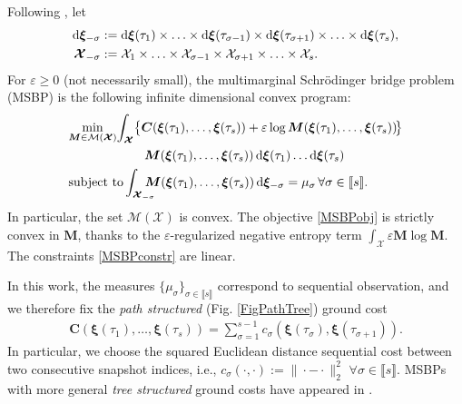 \documentclass[letterpaper, 10pt, twocolumn]{ieeeconf}      %
\newcommand{\differential}{{\rm{d}}}
\begin{document}
Following \cite[Sec. 3]{elvander2020multi}, let
{\small{\begin{subequations}
\begin{align}
\differential\bm{\xi}_{-\sigma}&:=\differential\bm{\xi}(\tau_{1})\times\hdots\times\differential\bm{\xi}(\tau_{\sigma-1})\times\differential\bm{\xi}(\tau_{\sigma+1})\times\hdots\times\differential\bm{\xi}(\tau_{s}),\\
\bm{\mathcal{X}}_{-\sigma}&:=\mathcal{X}_{1}\times\hdots\times\mathcal{X}_{\sigma -1}\times\mathcal{X}_{\sigma + 1}\times \hdots \times \mathcal{X}_{s}.    
\end{align}
\label{DefxiX}
\end{subequations}}} 
For $\varepsilon\geq 0$ (not necessarily small), the multimarginal Schr\"{o}dinger bridge problem (MSBP) is the following infinite dimensional convex program:
{\small{\begin{subequations}
\begin{align}
&\underset{\bm{M}\in \mathcal{M}\left(\bm{\mathcal{X}}\right)}{\min} \!\int_{\bm{\mathcal{X}}}\!\big\{\bm{C}\!\left(\bm{\xi}(\tau_{1}),\hdots,\bm{\xi}(\tau_{s})\right)+ \varepsilon\log\bm{M}\!\left(\bm{\xi}(\tau_{1}),\hdots,\bm{\xi}(\tau_{s})\right)\!\!\big\}\nonumber\\
&\qquad\qquad\qquad\bm{M}\!\left(\bm{\xi}(\tau_{1}),\hdots,\bm{\xi}(\tau_{s})\right)\differential\bm{\xi}(\tau_{1}) \hdots\differential\bm{\xi}(\tau_{s})\label{MSBPobj}\\
&\text{subject to}\int_{\bm{\mathcal{X}}_{-\sigma}}\!\!\!\!\!\!\bm{M}\!\left(\bm{\xi}(\tau_{1}), \hdots,\bm{\xi}(\tau_{s})\right)\differential\bm{\xi}_{-\sigma} = \mu_{\sigma}\,\forall\sigma\in\llbracket s\rrbracket.\label{MSBPconstr}
\end{align}
\label{MSBP}
\end{subequations}}}
In particular, the set $\mathcal{M}(\bm{\mathcal{X}})$ is convex. The objective \eqref{MSBPobj} is strictly convex in $\bm{M}$, thanks to the $\varepsilon$-regularized negative entropy term $\int_{\bm{\mathcal{X}}}\varepsilon \bm{M}\log\bm{M}$. The constraints \eqref{MSBPconstr} are linear.

In this work, the measures $\{\mu_{\sigma}\}_{\sigma\in\llbracket s\rrbracket}$ correspond to sequential observation, and we therefore fix the \emph{path structured} (Fig. \ref{FigPathTree}) ground cost
\begin{align}
\bm{C}\!\left(\bm{\xi}(\tau_{1}),\hdots,\bm{\xi}(\tau_{s})\right) = \sum_{\sigma=1}^{s-1}c_{\sigma}\left(\bm{\xi}(\tau_{\sigma}),\bm{\xi}(\tau_{\sigma+1})\right). 
\label{GroundCost}
\end{align}
In particular, we choose the squared Euclidean distance sequential cost between two consecutive snapshot indices, i.e., $c_{\sigma}(\cdot,\cdot):=\|\cdot - \cdot\|_2^2$ $\forall\sigma\in\llbracket s\rrbracket$. MSBPs with more general \emph{tree structured} ground costs have appeared in \cite{haasler2021multimarginal}. 
\end{document}
